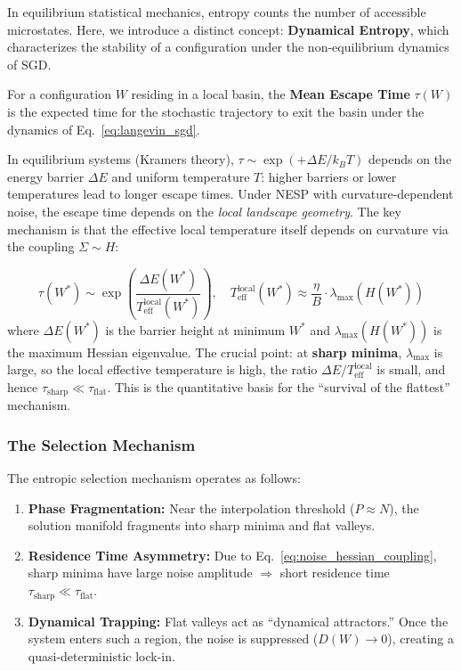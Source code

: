 \documentclass[
  journal=largetwo,
  year=2025,
  volume=37,
]{cup-journal}
\begin{document}
In equilibrium statistical mechanics, entropy counts the number of accessible microstates. Here, we introduce a distinct concept: \textbf{Dynamical Entropy}, which characterizes the stability of a configuration under the non-equilibrium dynamics of SGD.

\begin{definition}
For a configuration $W$ residing in a local basin, the \textbf{Mean Escape Time} $\tau(W)$ is the expected time for the stochastic trajectory to exit the basin under the dynamics of Eq.~\eqref{eq:langevin_sgd}.
\end{definition}

In equilibrium systems (Kramers theory), $\tau \sim \exp(+\Delta E / k_B T)$ depends on the energy barrier $\Delta E$ and uniform temperature $T$: higher barriers or lower temperatures lead to longer escape times. Under NESP with curvature-dependent noise, the escape time depends on the \textit{local landscape geometry}. The key mechanism is that the effective local temperature itself depends on curvature via the coupling $\Sigma \sim H$:

\begin{equation}\label{eq:escape_time_nesp}
    \tau(W^*) \sim \exp\left( \frac{\Delta E(W^*)}{T_{\text{eff}}^{\text{local}}(W^*)} \right), \quad T_{\text{eff}}^{\text{local}}(W^*) \approx \frac{\eta}{B} \cdot \lambda_{\max}(H(W^*))
\end{equation}
where $\Delta E(W^*)$ is the barrier height at minimum $W^*$ and $\lambda_{\max}(H(W^*))$ is the maximum Hessian eigenvalue. The crucial point: at \textbf{sharp minima}, $\lambda_{\max}$ is large, so the local effective temperature is high, the ratio $\Delta E / T_{\text{eff}}^{\text{local}}$ is small, and hence $\tau_{\text{sharp}} \ll \tau_{\text{flat}}$. This is the quantitative basis for the ``survival of the flattest'' mechanism.



\subsubsection{The Selection Mechanism}

The entropic selection mechanism operates as follows:

\begin{enumerate}
    \item \textbf{Phase Fragmentation:} Near the interpolation threshold ($P \approx N$), the solution manifold fragments into sharp minima and flat valleys.
    
    \item \textbf{Residence Time Asymmetry:} Due to Eq.~\eqref{eq:noise_hessian_coupling}, sharp minima have large noise amplitude $\Rightarrow$ short residence time $\tau_{\text{sharp}} \ll \tau_{\text{flat}}$.
    
    \item \textbf{Dynamical Trapping:} Flat valleys act as ``dynamical attractors.'' Once the system enters such a region, the noise is suppressed ($D(W) \to 0$), creating a quasi-deterministic lock-in.
\end{enumerate}
\end{document}
